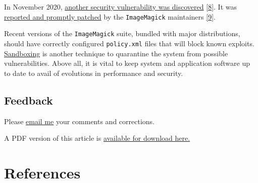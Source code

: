 \documentclass[
  12pt,
  british,
  a4paper,
  rgb,
  dvipsnames,
  svgnames,
  hyphens]{article}
\begin{document}
In November 2020,
\href{https://portswigger.net/daily-swig/imagemagick-pdf-parsing-flaw-allowed-attacker-to-execute-shell-commands-via-maliciously-crafted-image}{another
security vulnerability was discovered}
\protect\hyperlink{ref-leyden2020}{{[}8{]}}. It was
\href{https://insert-script.blogspot.com/2020/11/imagemagick-shell-injection-via-pdf.html}{reported
and promptly patched} by the \texttt{ImageMagick} maintainers
\protect\hyperlink{ref-infuhr2020}{{[}9{]}}.

Recent versions of the \texttt{ImageMagick} suite, bundled with major
distributions, should have correctly configured \texttt{policy.xml}
files that will block known exploits.
\href{https://www.techopedia.com/definition/25266/sandboxing}{Sandboxing}
is another technique to quarantine the system from possible
vulnerabilities. Above all, it is vital to keep system and application
software up to date to avail of evolutions in performance and security.

\hypertarget{feedback}{%
\subsection{Feedback}\label{feedback}}

Please \href{mailto:feedback.swanlotus@gmail.com}{email me} your
comments and corrections.

\noindent A PDF version of this article is
\href{image-format-conversions.pdf}{available for download here.}

\hypertarget{bibliography}{%
\section*{References}\label{bibliography}}
\end{document}
